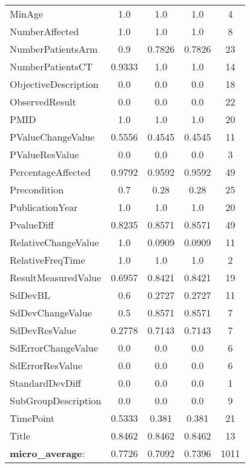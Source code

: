 \begin{longtable}{ l c c c c}
MinAge & 1.0 & 1.0 & 1.0 & 4\\
NumberAffected & 1.0 & 1.0 & 1.0 & 8\\
NumberPatientsArm & 0.9 & 0.7826 & 0.7826 & 23\\
NumberPatientsCT & 0.9333 & 1.0 & 1.0 & 14\\
ObjectiveDescription & 0.0 & 0.0 & 0.0 & 18\\
ObservedResult & 0.0 & 0.0 & 0.0 & 22\\
PMID & 1.0 & 1.0 & 1.0 & 20\\
PValueChangeValue & 0.5556 & 0.4545 & 0.4545 & 11\\
PValueResValue & 0.0 & 0.0 & 0.0 & 3\\
PercentageAffected & 0.9792 & 0.9592 & 0.9592 & 49\\
Precondition & 0.7 & 0.28 & 0.28 & 25\\
PublicationYear & 1.0 & 1.0 & 1.0 & 20\\
PvalueDiff & 0.8235 & 0.8571 & 0.8571 & 49\\
RelativeChangeValue & 1.0 & 0.0909 & 0.0909 & 11\\
RelativeFreqTime & 1.0 & 1.0 & 1.0 & 2\\
ResultMeasuredValue & 0.6957 & 0.8421 & 0.8421 & 19\\
SdDevBL & 0.6 & 0.2727 & 0.2727 & 11\\
SdDevChangeValue & 0.5 & 0.8571 & 0.8571 & 7\\
SdDevResValue & 0.2778 & 0.7143 & 0.7143 & 7\\
SdErrorChangeValue & 0.0 & 0.0 & 0.0 & 6\\
SdErrorResValue & 0.0 & 0.0 & 0.0 & 6\\
StandardDevDiff & 0.0 & 0.0 & 0.0 & 1\\
SubGroupDescription & 0.0 & 0.0 & 0.0 & 9\\
TimePoint & 0.5333 & 0.381 & 0.381 & 21\\
Title & 0.8462 & 0.8462 & 0.8462 & 13\\
\textbf{micro\_average}: & 0.7726 & 0.7092 & 0.7396 & 1011 
\label{tab:Diabetes_eventextr}
\end{longtable}
